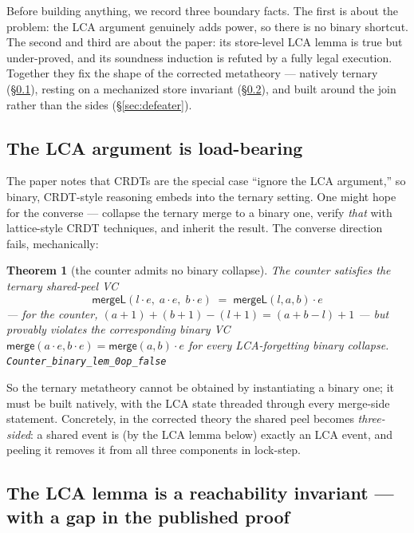 \documentclass[11pt]{article}
\newtheorem{theorem}{Theorem}[section]
\newcommand{\Merge}{\mathsf{merge}}
\newcommand{\mergeL}{\mathsf{mergeL}}
\newcommand{\lean}[1]{\texttt{#1}}
\begin{document}
Before building anything, we record three boundary facts. The first is
about the problem: the LCA argument genuinely adds power, so there is no
binary shortcut. The second and third are about the paper: its
store-level LCA lemma is true but under-proved, and its soundness
induction is refuted by a fully legal execution. Together they fix the
shape of the corrected metatheory --- natively ternary
(\S\ref{sec:loadbearing}), resting on a mechanized store invariant
(\S\ref{sec:lca}), and built around the join rather than the sides
(\S\ref{sec:defeater}).

\subsection{The LCA argument is load-bearing}
\label{sec:loadbearing}

The paper notes that CRDTs are the special case ``ignore the LCA
argument,'' so binary, CRDT-style reasoning embeds into the ternary
setting. One might hope for the converse --- collapse the ternary merge
to a binary one, verify \emph{that} with lattice-style CRDT techniques,
and inherit the result. The converse direction fails, mechanically:

\begin{theorem}[the counter admits no binary collapse]
\label{thm:counter-sep}
The counter satisfies the ternary shared-peel VC
\[
  \mergeL(l \cdot e,\; a \cdot e,\; b \cdot e)
  \;=\; \mergeL(l,a,b) \cdot e
\]
--- for the counter, $(a{+}1)+(b{+}1)-(l{+}1) = (a{+}b{-}l)+1$ ---
but provably violates the corresponding binary VC
$\Merge(a \cdot e, b \cdot e) = \Merge(a,b) \cdot e$ for every
LCA-forgetting binary collapse.
\unskip\nobreak\hspace*{\fill}\lean{Counter\_binary\_lem\_0op\_false}
\end{theorem}

So the ternary metatheory cannot be obtained by instantiating a binary one;
it must be built natively, with the LCA state threaded through every
merge-side statement. Concretely, in the corrected theory the shared peel
becomes \emph{three-sided}: a shared event is (by the LCA lemma below)
exactly an LCA event, and peeling it removes it from all three components
in lock-step.

\subsection{The LCA lemma is a reachability invariant --- with a gap in the
published proof}
\label{sec:lca}
\end{document}
